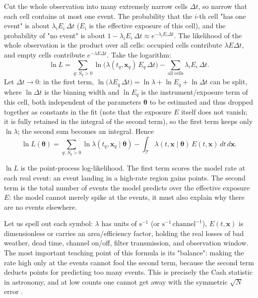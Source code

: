 Cut the whole observation into many extremely narrow cells $\Delta t$, so narrow that each cell contains at most one event. The probability that the $i$-th cell "has one event" is about $\lambda_i E_i\,\Delta t$ ($E_i$ is the effective exposure of this cell), and the probability of "no event" is about $1-\lambda_i E_i\,\Delta t\approx e^{-\lambda_i E_i\Delta t}$. The likelihood of the whole observation is the product over all cells: occupied cells contribute $\lambda E\Delta t$, and empty cells contribute $e^{-\lambda E\Delta t}$. Take the logarithm:
\[
  \ln L
  =\sum_{q:\,S_q>0}\ln\!\big(\lambda(t_q,\bm x_q)\,E_q\,\Delta t\big)
   -\sum_{\text{all cells}}\lambda_i E_i\,\Delta t .
\]
Let $\Delta t\to0$: in the first term, $\ln\!\big(\lambda E_q\,\Delta t\big)=\ln\lambda+\ln E_q+\ln\Delta t$ can be split, where $\ln\Delta t$ is the binning width and $\ln E_q$ is the instrument/exposure term of this cell, both independent of the parameters $\bm\theta$ to be estimated and thus dropped together as constants in the fit (note that the exposure $E$ itself does not vanish; it is fully retained in the integral of the second term), so the first term keeps only $\ln\lambda$; the second sum becomes an integral. Hence
\begin{equation}
  \ln L(\bm\theta)
  =
  \sum_{q:\,S_q>0}\ln\lambda(t_q,\bm x_q\mid\bm\theta)
  -\int_{\mathcal T}\lambda(t,\bm x\mid\bm\theta)\,E(t,\bm x)\,dt\,d\bm x .
  \label{eq:e14-point-likelihood}
\end{equation}
\begin{formulaexplain}
$\ln L$ is the point-process log-likelihood. The first term scores the model rate at each real event: an event landing in a high-rate region gains points. The second term is the total number of events the model predicts over the effective exposure $E$: the model cannot merely spike at the events, it must also explain why there are no events elsewhere.
\end{formulaexplain}
Let us spell out each symbol: $\lambda$ has units of $\mathrm{s^{-1}}$ (or $\mathrm{s^{-1}\,channel^{-1}}$), $E(t,\bm x)$ is dimensionless or carries an area/efficiency factor, holding the real losses of bad weather, dead time, channel on/off, filter transmission, and observation window. The most important teaching point of this formula is its "balance": making the rate high only at the events cannot fool the second term, because the second term deducts points for predicting too many events. This is precisely the Cash statistic in astronomy, and at low counts one cannot get away with the symmetric $\sqrt N$ error \citep{1979ApJ...228..939C,1986ApJ...303..336G}.

